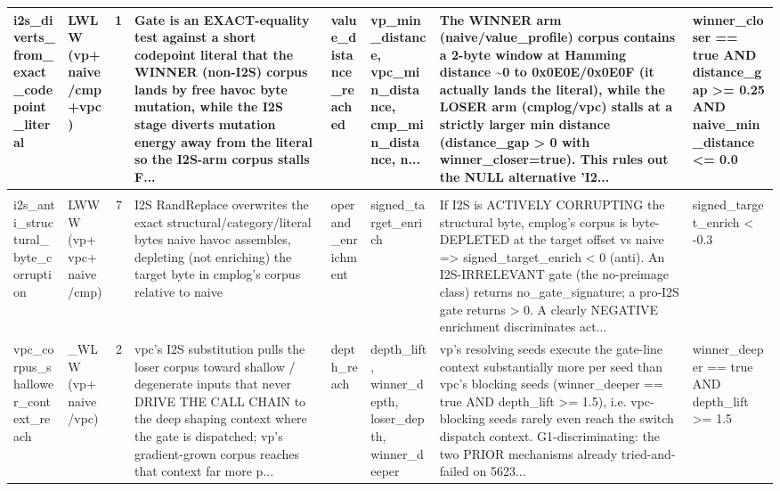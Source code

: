 \documentclass[7pt]{extarticle}
\begin{document}
{\begin{longtable}{@{}p{2.4cm}p{1.9cm}rp{4.3cm}p{1.5cm}p{1.7cm}p{4.6cm}p{3.0cm}@{}}
i2s\_\allowbreak diverts\_\allowbreak from\_\allowbreak exact\_\allowbreak codepoint\_\allowbreak literal & LWLW (vp+naive/cmp+vpc) & 1 & Gate is an EXACT-equality test against a short codepoint literal that the WINNER (non-I2S) corpus lands by free havoc byte mutation, while the I2S stage diverts mutation energy away from the literal so the I2S-arm corpus stalls F... & value\_\allowbreak distance\_\allowbreak reached & vp\_\allowbreak min\_\allowbreak distance, vpc\_\allowbreak min\_\allowbreak distance, cmp\_\allowbreak min\_\allowbreak distance, n... & The WINNER arm (naive/value\_\allowbreak profile) corpus contains a 2-byte window at Hamming distance \textasciitilde{}0 to 0x0E0E/0x0E0F (it actually lands the literal), while the LOSER arm (cmplog/vpc) stalls at a strictly larger min distance (distance\_\allowbreak gap \textgreater{} 0 with winner\_\allowbreak closer=true). This rules out the NULL alternative 'I2... & winner\_\allowbreak closer == true AND distance\_\allowbreak gap \textgreater{}= 0.25 AND naive\_\allowbreak min\_\allowbreak distance \textless{}= 0.0\\
\midrule
\rowcolor{black!10}\multicolumn{8}{@{}l}{\textbf{[I2S-anti]\ \ i2s\_\allowbreak anti\_\allowbreak structural\_\allowbreak byte\_\allowbreak corruption}\quad(final feature, n=10)}\\
i2s\_\allowbreak anti\_\allowbreak structural\_\allowbreak byte\_\allowbreak corruption & LWWW (vp+vpc+naive/cmp) & 7 & I2S RandReplace overwrites the exact structural/category/literal bytes naive havoc assembles, depleting (not enriching) the target byte in cmplog's corpus relative to naive & operand\_\allowbreak enrichment & signed\_\allowbreak target\_\allowbreak enrich & If I2S is ACTIVELY CORRUPTING the structural byte, cmplog's corpus is byte-DEPLETED at the target offset vs naive =\textgreater{} signed\_\allowbreak target\_\allowbreak enrich \textless{} 0 (anti). An I2S-IRRELEVANT gate (the no-preimage class) returns no\_\allowbreak gate\_\allowbreak signature; a pro-I2S gate returns \textgreater{} 0. A clearly NEGATIVE enrichment discriminates act... & signed\_\allowbreak target\_\allowbreak enrich \textless{} -0.3\\
vpc\_\allowbreak corpus\_\allowbreak shallower\_\allowbreak context\_\allowbreak reach & \_\allowbreak WLW (vp+naive/vpc) & 2 & vpc's I2S substitution pulls the loser corpus toward shallow / degenerate inputs that never DRIVE THE CALL CHAIN to the deep shaping context where the gate is dispatched; vp's gradient-grown corpus reaches that context far more p... & depth\_\allowbreak reach & depth\_\allowbreak lift, winner\_\allowbreak depth, loser\_\allowbreak depth, winner\_\allowbreak deeper & vp's resolving seeds execute the gate-line context substantially more per seed than vpc's blocking seeds (winner\_\allowbreak deeper == true AND depth\_\allowbreak lift \textgreater{}= 1.5), i.e. vpc-blocking seeds rarely even reach the switch dispatch context. G1-discriminating: the two PRIOR mechanisms already tried-and-failed on 5623... & winner\_\allowbreak deeper == true AND depth\_\allowbreak lift \textgreater{}= 1.5\\

\end{longtable}}
\end{document}
